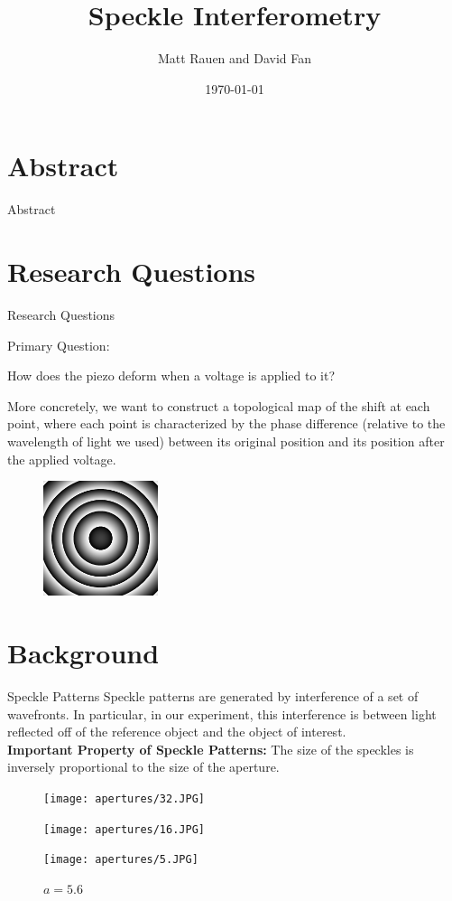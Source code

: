 \documentclass[pdf]{beamer}
\title{Speckle Interferometry}
\author{Matt Rauen and David Fan}
\date{\today}
\begin{document}
\begin{frame}
\titlepage
\end{frame}

\section{Abstract}
\begin{frame}{Abstract}

\end{frame}

\section{Research Questions}
\begin{frame}{Research Questions}
\begin{center}
Primary Question:

How does the piezo deform when a voltage is applied to it?
\end{center}
More concretely, we want to construct a topological map of the shift at each point, where each point is characterized by the phase difference (relative to the wavelength of light we used) between its original position and its position after the applied voltage.
\begin{figure}[htbp]
\centering
\includegraphics[width=0.3\textwidth]{gaussian_bump.png}
\end{figure}
\end{frame}

\section{Background}
\begin{frame}{Speckle Patterns}
Speckle patterns are generated by interference of a set of wavefronts. In particular, in our experiment, this interference is between light reflected off of the reference object and the object of interest.\\
\vspace{0.5cm}
{\bf Important Property of Speckle Patterns:}
The size of the speckles is inversely proportional to the size of the aperture.
\begin{figure}[!htb]
  \texttt{[image: apertures/32.JPG]}
  \caption{$a=32$}
\endminipage\hfill
{}
  \texttt{[image: apertures/16.JPG]}
  \caption{$a=16$}
\endminipage\hfill
{}
  \texttt{[image: apertures/5.JPG]}
  \caption{$a=5.6$}
\endminipage
\end{figure}
\end{frame}
\end{document}
